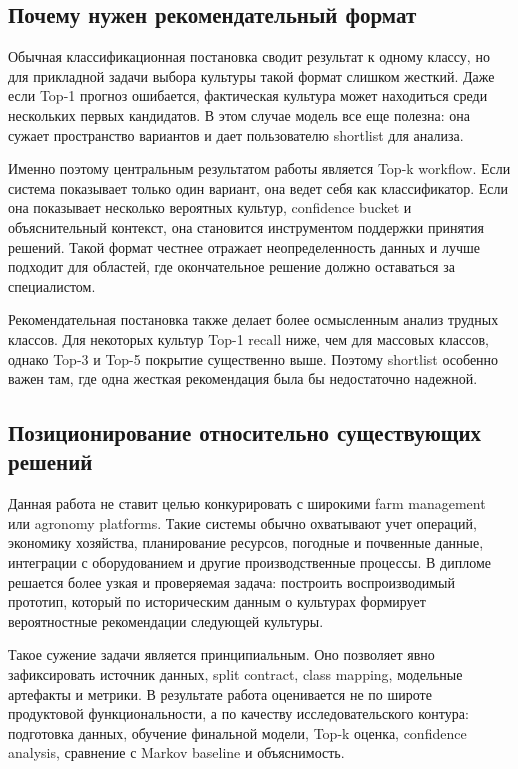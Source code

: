 \documentclass[a4paper,article,14pt]{extarticle}
\begin{document}
\subsection{Почему нужен рекомендательный формат}

Обычная классификационная постановка сводит результат к одному классу, но для прикладной задачи выбора культуры такой формат слишком жесткий. Даже если Top-1 прогноз ошибается, фактическая культура может находиться среди нескольких первых кандидатов. В этом случае модель все еще полезна: она сужает пространство вариантов и дает пользователю shortlist для анализа.

Именно поэтому центральным результатом работы является Top-k workflow. Если система показывает только один вариант, она ведет себя как классификатор. Если она показывает несколько вероятных культур, confidence bucket и объяснительный контекст, она становится инструментом поддержки принятия решений. Такой формат честнее отражает неопределенность данных и лучше подходит для областей, где окончательное решение должно оставаться за специалистом.

Рекомендательная постановка также делает более осмысленным анализ трудных классов. Для некоторых культур Top-1 recall ниже, чем для массовых классов, однако Top-3 и Top-5 покрытие существенно выше. Поэтому shortlist особенно важен там, где одна жесткая рекомендация была бы недостаточно надежной.

\subsection{Позиционирование относительно существующих решений}

Данная работа не ставит целью конкурировать с широкими farm management или agronomy platforms. Такие системы обычно охватывают учет операций, экономику хозяйства, планирование ресурсов, погодные и почвенные данные, интеграции с оборудованием и другие производственные процессы. В дипломе решается более узкая и проверяемая задача: построить воспроизводимый прототип, который по историческим данным о культурах формирует вероятностные рекомендации следующей культуры.

Такое сужение задачи является принципиальным. Оно позволяет явно зафиксировать источник данных, split contract, class mapping, модельные артефакты и метрики. В результате работа оценивается не по широте продуктовой функциональности, а по качеству исследовательского контура: подготовка данных, обучение финальной модели, Top-k оценка, confidence analysis, сравнение с Markov baseline и объяснимость.
\end{document}
